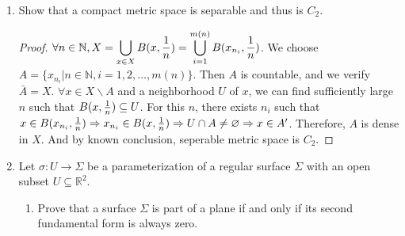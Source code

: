\documentclass{article}
\def\emptyset{\varnothing}
\begin{document}
\begin{enumerate}
\begin{proof}
\begin{enumerate}[label=(\alph*)]
Consider a rational point $p$ and the closed set $S(=Q^c)$. 
Suppose $U\backslash A$ is an open neighborhood containing $p$, then all rational points within $U$ are in this set. 
Take an rational number $q$ from $U$, $q\neq p$. For any open neighborhood $V \backslash B$ containing $S$, $q\in V$, where $V$ is $\mathbb{R}$.  
$\Rightarrow (U\backslash A)\cap (V\backslash B) \neq \emptyset$ and the topology defined in this problem is not $T_3$.

\item Let $\mathcal{N} = \{ \{x\}\cup (B(x,{1\over n})\backslash S),n=1,2,\dots\}$. 
For a neighborhood $ U\backslash A $ of $ x $, we can find sufficiently large $n$ 
such that $B(x,{1\over n})\subseteq U \Rightarrow 
\{x\} \cup (B(x,{1\over n})\backslash Q^c) \subseteq U\backslash A $. 
Therefore, $(X,T)$ is $C_1$.
\item $\forall S_1\subset S,S_1 = S\cap (\mathbb{R}\backslash(S\backslash S_1))$ is open  in $S$. 
Thus $S$ has discrete topology. 
Let $A \subseteq S$, since each single point set is open, the accumulated point set of $A$ is empty. If $A$ is dense in $S$, $\bar{A}=S\Rightarrow A=S$ and $A$ is uncountable. Hence $S$ cannot be separable. 
\item Assume $(X,T)$ is $C_2$, then $(S,T)$ is $C_2$. $C_2$ space is separable, a contradiction. 
\end{enumerate}
\end{proof}
\item Show that a compact metric space is separable and thus is $C_2$.
\begin{proof}
$\forall n\in \mathbb{N},X = \displaystyle\bigcup_{x\in X} B(x,{1\over n}) = \displaystyle\bigcup_{i=1}^{m(n)} B(x_{n_i},{1 \over n})$. We choose $A=\{x_{n_i}| n\in \mathbb{N},i=1,2,\dots,m(n)\}$. Then $A$ is countable, and we verify $\bar{A}=X$. $\forall x\in X\backslash A$ and a neighborhood $U$ of $x$, we can find sufficiently large $n$ such that $B(x,{1\over n})\subseteq U$. For this $n$, there exists $n_i$ such that 
$x \in B(x_{n_i},{1\over n})\Rightarrow x_{n_i}\in B(x,{1\over n})\Rightarrow U\cap A\neq \emptyset \Rightarrow x \in A'$. Therefore, $A$ is dense in $X$. And by known conclusion, seperable metric space is $C_2$.
\end{proof}
\item Let $\sigma: U\to \Sigma $ be a parameterization of a regular surface $\Sigma$ with an open subset $U\subseteq \mathbb{R}^2$.
\begin{enumerate}[label=(\arabic*)]
\item Prove that a surface $\Sigma$ is part of a plane if and only if its second fundamental form is always zero.

\end{enumerate}
\end{enumerate}
\end{document}
